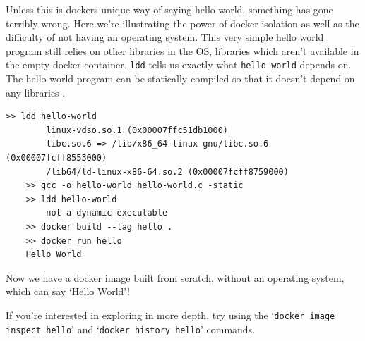 Unless this is dockers unique way of saying hello world, something has gone terribly wrong.
Here we're illustrating the power of docker isolation as well as the difficulty of not having an operating system.
This very simple hello world program still relies on other libraries in the OS, libraries which aren't available in the empty docker container.
\texttt{ldd} tells us exactly what \texttt{hello-world} depends on.
The hello world program can be statically compiled so that it doesn't depend on any libraries \cite{static-hello-world}.

\begin{shaded*}
\begin{lstlisting}[language=shell]
    >> ldd hello-world
        linux-vdso.so.1 (0x00007ffc51db1000)
        libc.so.6 => /lib/x86_64-linux-gnu/libc.so.6 (0x00007fcff8553000)
        /lib64/ld-linux-x86-64.so.2 (0x00007fcff8759000)
    >> gcc -o hello-world hello-world.c -static
    >> ldd hello-world
        not a dynamic executable
    >> docker build --tag hello .
    >> docker run hello
    Hello World
\end{lstlisting}
\end{shaded*}

Now we have a docker image built from scratch, without an operating system, which can say `Hello World'!
\begin{extra}
If you're interested in exploring in more depth, try using the `\texttt{docker image inspect hello}'
and `\texttt{docker history hello}' commands.
\end{extra}
